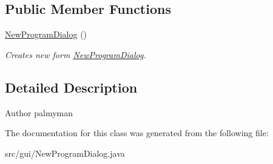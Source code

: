 \subsection*{Public Member Functions}
\begin{DoxyCompactItemize}
\item 
\hypertarget{classgui_1_1NewProgramDialog_a8d544e87a6426218e20fca917dcfe7d8}{\hyperlink{classgui_1_1NewProgramDialog_a8d544e87a6426218e20fca917dcfe7d8}{New\-Program\-Dialog} ()}\label{classgui_1_1NewProgramDialog_a8d544e87a6426218e20fca917dcfe7d8}

\begin{DoxyCompactList}\small\item\em Creates new form \hyperlink{classgui_1_1NewProgramDialog}{New\-Program\-Dialog}. \end{DoxyCompactList}\end{DoxyCompactItemize}


\subsection{Detailed Description}
\begin{DoxyAuthor}{Author}
palmyman 
\end{DoxyAuthor}


The documentation for this class was generated from the following file\-:\begin{DoxyCompactItemize}
\item 
src/gui/New\-Program\-Dialog.\-java\end{DoxyCompactItemize}
